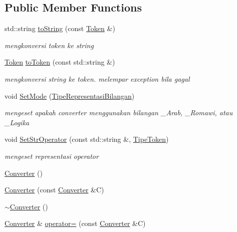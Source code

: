 \subsection*{Public Member Functions}
\begin{DoxyCompactItemize}
\item 
std\-::string \hyperlink{class_converter_a8a22c530d91f9b0de64c28cb990dc6bb}{to\-String} (const \hyperlink{class_token}{Token} \&)
\begin{DoxyCompactList}\small\item\em mengkonversi token ke string \end{DoxyCompactList}\item 
\hyperlink{class_token}{Token} \hyperlink{class_converter_aa7b74352c29c5bcf28ed85cf892f3517}{to\-Token} (const std\-::string \&)
\begin{DoxyCompactList}\small\item\em mengkonversi string ke token. melempar exception bila gagal \end{DoxyCompactList}\item 
void \hyperlink{class_converter_a4897e820fd8ab55da965cefda2901fc1}{Set\-Mode} (\hyperlink{class_converter_a1caaefa1f3fba463bd215e8e7f12872f}{Tipe\-Representasi\-Bilangan})
\begin{DoxyCompactList}\small\item\em mengeset apakah converter menggunakan bilangan \-\_\-\-Arab, \-\_\-\-Romawi, atau \-\_\-\-Logika \end{DoxyCompactList}\item 
void \hyperlink{class_converter_a60a0c269a84ec77acf6a7f4ee9ce589e}{Set\-Str\-Operator} (const std\-::string \&, \hyperlink{_token_8h_a29ea73031d51befacf649fa6af865e30}{Tipe\-Token})
\begin{DoxyCompactList}\small\item\em mengeset representasi operator \end{DoxyCompactList}\end{DoxyCompactItemize}
{\bf }\par
\begin{DoxyCompactItemize}
\item 
\hyperlink{class_converter_a1de81f3e06093411e5d27ce882bc010f}{Converter} ()
\item 
\hyperlink{class_converter_a11cf08fca2f84ab67fec9b935badca90}{Converter} (const \hyperlink{class_converter}{Converter} \&C)
\item 
\hyperlink{class_converter_a9ecd05695a52c03158b81e544e13b996}{$\sim$\-Converter} ()
\item 
\hyperlink{class_converter}{Converter} \& \hyperlink{class_converter_addd00b03af5ab50e3586e7889e6d6ce9}{operator=} (const \hyperlink{class_converter}{Converter} \&C)
\end{DoxyCompactItemize}



